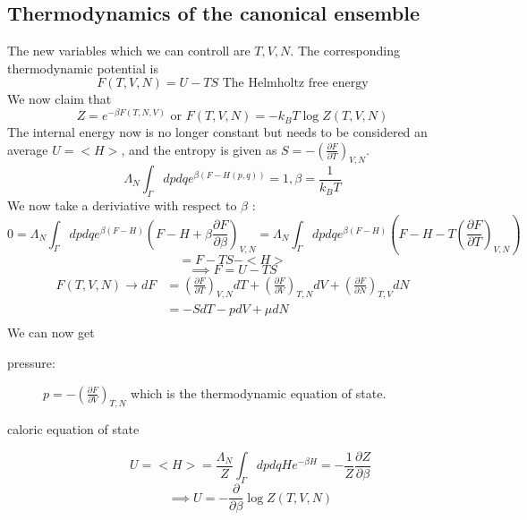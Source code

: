 \documentclass{report}
\begin{document}
\subsection{Thermodynamics of the canonical ensemble}
The new variables which we can controll are $T,V,N$. The corresponding thermodynamic potential is \[
  F\left( T,V,N \right) = U - TS \text{        The Helmholtz free energy}
\] We now claim that \[
Z = e^{-\beta F\left( T,N,V \right) } \text{ or } F\left( T,V,N \right) = -k_B T \log Z\left( T,V,N \right) 
\] The internal energy now is no longer constant but needs to be considered an average $U = <H>$, and the entropy is given as $S = -\left( \frac{\partial F}{\partial T} \right)_{V,N}$. \[
\Lambda_N \int_\Gamma dpdq e^{\beta\left( F - H\left( p,q \right)  \right) } = 1, \beta = \frac{1}{k_BT}
\] We now take a deriviative with respect to $\beta$ : \[
0 = \Lambda_N \int_\Gamma dpdq e^{\beta\left( F-H \right) } \left( F-H + \beta \frac{\partial F}{\partial \beta} \right) _{V,N} = \Lambda_N \int_\Gamma dpdq e^{\beta\left( F - H \right) } \left( F -H - T \left( \frac{\partial F}{\partial T} \right) _{V,N} \right) 
\] \[
= F - TS - <H>
\] \[
\implies F = U - TS
\] 
\begin{align*}
  F\left( T,V,N \right) \to dF &= \left( \frac{\partial F }{\partial T} \right) _{V,N} dT + \left( \frac{\partial F}{\partial V } \right) _{T,N} dV + \left( \frac{\partial F }{\partial N} \right) _{T,V} dN\\
  &= -S dT - p dV + \mu dN \\
\end{align*}
We can now get 
\begin{description}
  \item[pressure:] $p = -\left( \frac{\partial F}{\partial V} \right) _{T,N}$ which is the thermodynamic equation of state.
  \item[caloric equation of state] \[
  U = <H> = \frac{\Lambda_N}{Z} \int_\Gamma dpdq H e^{-\beta H} = -\frac{1}{Z} \frac{\partial Z}{\partial \beta}
  \] \[
  \implies U = -\frac{\partial }{\partial \beta} \log Z\left( T,V,N \right) 
  \] 
\end{description}
\end{document}
